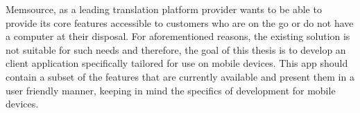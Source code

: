 Memsource, as a leading translation platform provider wants to be able to provide its core features accessible to customers who are on the go or do not have a computer at their disposal. For aforementioned reasons, the existing solution is not suitable for such needs and therefore, the goal of this thesis is to develop an client application specifically tailored for use on mobile devices. This app should contain a subset of the features that are currently available and present them in a user friendly manner, keeping in mind the specifics of development for mobile devices.




